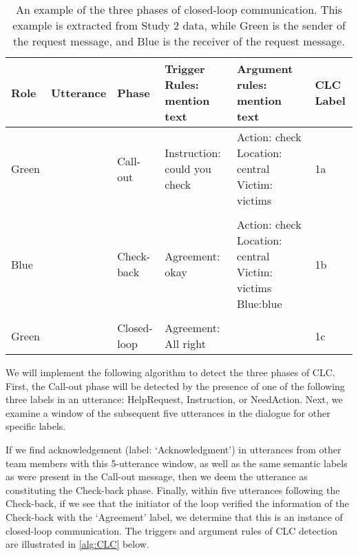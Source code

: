 \begin{table}
    \footnotesize
    \centering
    \begin{tabularx}{6in}{lXlp{1.2in}p{1in}p{0.4in}}
        \toprule
        Role  & Utterance         & Phase       & Trigger Rules: mention text  & Argument rules: mention text                                                         & CLC Label\\\midrule
        Green & \utteranceone{}   & Call-out    & Instruction: could you check & Action: check \newline Location: central \newline Victim: victims                    & 1a\\\\
        Blue  & \utterancetwo{}   & Check-back  & Agreement: okay              & Action: check \newline Location: central \newline Victim: victims \newline Blue:blue & 1b\\\\
        Green & \utterancethree{} & Closed-loop & Agreement: All right         &                                                                                      & 1c\\
        \bottomrule
    \end{tabularx}
    \caption{%
        An example of the three phases of closed-loop communication. This
        example is extracted from Study 2 data, while Green is the sender of the
        request message, and Blue is the receiver of the request message.
    }
    \label{tab:clc-three-phases}
\end{table}

We will implement the following algorithm to detect the three phases of CLC.
First, the Call-out phase will be detected by the presence of one of the
following three labels in an utterance: HelpRequest, Instruction, or
NeedAction.  Next, we examine a window of the subsequent five utterances in
the dialogue for other specific labels.

If we find acknowledgement (label: `Acknowledgment') in utterances from other
team members with this 5-utterance window, as well as the same semantic labels
as were present in the Call-out message, then we deem the utterance as
constituting the Check-back phase. Finally, within five utterances following
the Check-back, if we see that the initiator of the loop verified the
information of the Check-back with the `Agreement' label, we determine that
this is an instance of closed-loop communication. The triggers and argument
rules of CLC detection are illustrated in \autoref{alg:CLC} below.

